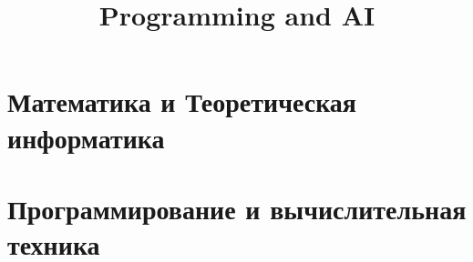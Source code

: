 \documentclass{article}
\title{Programming and AI} %
\begin{document}
	
\maketitle %
\tableofcontents
\section{Математика и Теоретическая информатика}














































\newpage

\section{Программирование и вычислительная техника}












\end{document}

